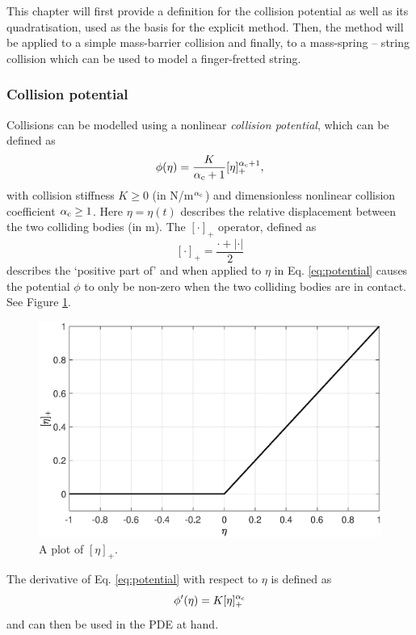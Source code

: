 This chapter will first provide a definition for the collision potential as well as its quadratisation, used as the basis for the explicit method. Then, the method will be applied to a simple mass-barrier collision and finally, to a mass-spring -- string collision which can be used to model a finger-fretted string.

\subsubsection{Collision potential}
Collisions can be modelled using a nonlinear \textit{collision potential}, which can be defined as
\begin{equation}\label{eq:potential}
    \phi(\eta) = \frac{K}{\alpha_{\text{c}}+1}[\eta]_+^{\alpha_{\text{c}}+1},
\end{equation}
with collision stiffness $K \geq 0$ (in N/m$^{\alpha_{\text{c}}}$) and dimensionless nonlinear collision coefficient $\alpha_{\text{c}} \geq 1$. Here $\eta = \eta(t)$ describes the relative displacement between the two colliding bodies (in m). The $[\cdot ]_+$ operator, defined as 
\begin{equation}\label{eq:etaPlus}
    [\cdot]_+ = \frac{\cdot + |\cdot|}{2}
\end{equation}
describes the `positive part of' and when applied to $\eta$ in Eq. \eqref{eq:potential} causes the potential $\phi$ to only be non-zero when the two colliding bodies are in contact. See Figure \ref{fig:eta}.
%
\begin{figure}[h]
\centerline{\includegraphics[width=0.6\columnwidth]{figures/interactions/eta.eps}}
\caption{\label{fig:eta}{A plot of $[\eta]_+$.}}
\end{figure}

\noindent The derivative of Eq. \eqref{eq:potential} with respect to $\eta$ is defined as 
\begin{equation}\label{eq:derivPotential}
    \phi'(\eta) = K[\eta]_+^{\alpha_{\text{c}}}
\end{equation}
and can then be used in the PDE at hand. 

